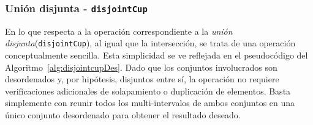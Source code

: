\subsubsection{Unión disjunta - \texttt{disjointCup}}

En lo que respecta a la operación correspondiente a la \textit{unión disjunta}(\texttt{disjointCup}), al igual que la intersección, se trata de una operación conceptualmente sencilla. Esta simplicidad se ve reflejada en el pseudocódigo del Algoritmo~\ref{alg:disjointcupDes}. Dado que los conjuntos involucrados son desordenados y, por hipótesis, disjuntos entre sí, la operación no requiere verificaciones adicionales de solapamiento o duplicación de elementos. Basta simplemente con reunir todos los multi-intervalos de ambos conjuntos en una único conjunto desordenado para obtener el resultado deseado.


